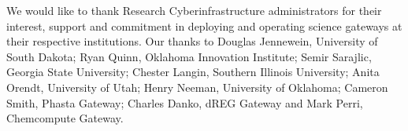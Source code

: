 \documentclass[sigconf]{acmart}
\begin{document}
\begin{acks}
We would like to thank Research Cyberinfrastructure administrators for their interest, support and commitment in deploying and operating science gateways at their respective institutions. Our thanks to Douglas Jennewein, University of South Dakota; Ryan Quinn, Oklahoma Innovation Institute; Semir Sarajlic, Georgia State University; Chester Langin, Southern Illinois University; Anita Orendt, University of Utah; Henry Neeman, University of Oklahoma; Cameron Smith, Phasta Gateway; Charles Danko, dREG Gateway and Mark Perri, Chemcompute Gateway.

\end{acks}



\end{document}
